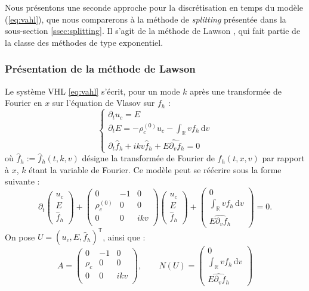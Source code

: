 Nous présentons une seconde approche pour la discrétisation en temps du modèle (\ref{eq:vahl}), que nous comparerons à la méthode de \emph{splitting} présentée dans la sous-section \ref{ssec:splitting}. Il s'agit de la méthode de Lawson \cite{Lawson:1967}, qui fait partie de la classe des méthodes de type exponentiel.

\subsubsection{Présentation de la méthode de Lawson}

Le système VHL \eqref{eq:vahl} s'écrit, pour un mode $k$ après une transformée de Fourier en $x$ sur l'équation de Vlasov sur $f_h$ :
\begin{equation}
  \begin{cases}
    \partial_t u_c = E \\
    \partial_t E = -\rho_c^{(0)}u_c - \int_\mathbb{R} vf_h\,\mathrm{d}v \\
    \partial_t \hat{f}_h + ikv \hat{f}_h + \widehat{E\partial_vf_h} = 0
  \end{cases}
  \label{eq:vahlfft}
\end{equation}
où $\hat{f}_h:= \hat{f}_h(t, k, v)$ désigne la transformée de Fourier de $f_h(t, x,v)$ par rapport à $x$, $k$ étant la variable de Fourier. Ce modèle peut se réécrire sous la forme suivante :
$$
  \partial_t\begin{pmatrix} u_c \\ E \\ \hat{f}_h \end{pmatrix}
  + \begin{pmatrix}
    0            & -1 & 0   \\
    \rho_c^{(0)} &  0 & 0   \\
    0            &  0 & ikv \\
  \end{pmatrix}\begin{pmatrix} u_c \\ E \\ \hat{f}_h \end{pmatrix}
  + \begin{pmatrix} 0 \\ \int_\mathbb{R} vf_h\,\mathrm{d}v \\ \widehat{E\partial_vf_h} \end{pmatrix}
  = 0. 
$$
On pose $U =\left(u_c , E , \hat{f}_h\right)^{\textsf{T}}$, ainsi que :
$$
  A = \begin{pmatrix}0 & -1 & 0 \\ \rho_c & 0 & 0 \\ 0 & 0 & ikv \\ \end{pmatrix},\qquad N(U) = \begin{pmatrix} 0 \\ \int_\mathbb{R} vf_h\,\mathrm{d}v \\ \widehat{E\partial_vf_h} \end{pmatrix}
$$
